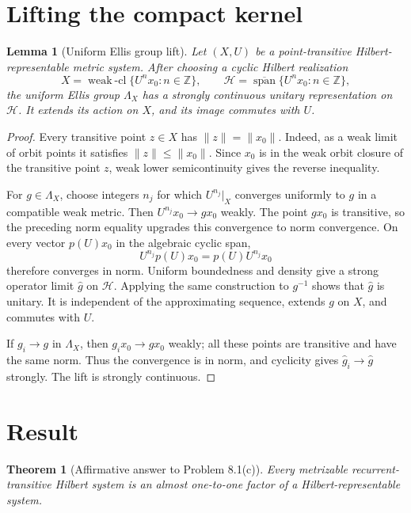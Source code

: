 \documentclass[11pt]{article}
\newtheorem{theorem}{Theorem}
\newtheorem{lemma}{Lemma}
\newcommand{\Hh}{\mathcal H}
\newcommand{\cl}{\overline}
\begin{document}
\section*{Lifting the compact kernel}

\begin{lemma}[Uniform Ellis group lift]
Let $(X,U)$ be a point-transitive Hilbert-representable metric system.  After
choosing a cyclic Hilbert realization
\[
 X=\operatorname{weak\!\!-cl}\{U^nx_0:n\in\mathbb Z\},
 \qquad
 \Hh=\cl{\operatorname{span}}\{U^nx_0:n\in\mathbb Z\},
\]
the uniform Ellis group $\Lambda_X$ has a strongly continuous unitary
representation on $\Hh$.  It extends its action on $X$, and its image commutes
with $U$.
\end{lemma}

\begin{proof}
Every transitive point $z\in X$ has $\|z\|=\|x_0\|$.  Indeed, as a weak limit
of orbit points it satisfies $\|z\|\leq\|x_0\|$.  Since $x_0$ is in the weak
orbit closure of the transitive point $z$, weak lower semicontinuity gives the
reverse inequality.

For $g\in\Lambda_X$, choose integers $n_j$ for which $U^{n_j}|_X$ converges
uniformly to $g$ in a compatible weak metric.  Then
$U^{n_j}x_0\to gx_0$ weakly.  The point $gx_0$ is transitive, so the preceding
norm equality upgrades this convergence to norm convergence.  On every
vector $p(U)x_0$ in the algebraic cyclic span,
\[
 U^{n_j}p(U)x_0=p(U)U^{n_j}x_0
\]
therefore converges in norm.  Uniform boundedness and density give a strong
operator limit $\widehat g$ on $\Hh$.  Applying the same construction to
$g^{-1}$ shows that $\widehat g$ is unitary.  It is independent of the
approximating sequence, extends $g$ on $X$, and commutes with $U$.

If $g_i\to g$ in $\Lambda_X$, then $g_ix_0\to gx_0$ weakly; all these points
are transitive and have the same norm.  Thus the convergence is in norm, and
cyclicity gives $\widehat g_i\to\widehat g$ strongly.  The lift is strongly
continuous.
\end{proof}

\section*{Result}

\begin{theorem}[Affirmative answer to Problem 8.1(c)]
Every metrizable recurrent-transitive Hilbert system is an almost one-to-one
factor of a Hilbert-representable system.
\end{theorem}
\end{document}
